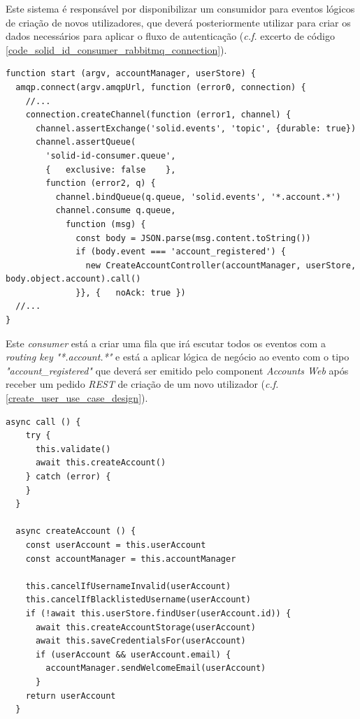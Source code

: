 Este sistema é responsável por disponibilizar um consumidor para eventos lógicos de criação de novos utilizadores, que deverá posteriormente utilizar para criar os dados necessários para aplicar o fluxo de autenticação (\emph{c.f.} excerto de código \ref{code_solid_id_consumer_rabbitmq_connection}).

\begin{lstlisting}[caption={\emph{Consumer} responsável pela ligação ao \emph{RabbitMQ}}, label={code_solid_id_consumer_rabbitmq_connection}]
function start (argv, accountManager, userStore) {
  amqp.connect(argv.amqpUrl, function (error0, connection) {
    //...
    connection.createChannel(function (error1, channel) {
      channel.assertExchange('solid.events', 'topic', {durable: true})
      channel.assertQueue(
        'solid-id-consumer.queue',
        {   exclusive: false    },
        function (error2, q) {
          channel.bindQueue(q.queue, 'solid.events', '*.account.*')
          channel.consume q.queue,
            function (msg) {
              const body = JSON.parse(msg.content.toString())
              if (body.event === 'account_registered') {
                new CreateAccountController(accountManager, userStore, body.object.account).call()
              }}, {   noAck: true })
  //...
}

\end{lstlisting}

Este \emph{consumer} está a criar uma fila que irá escutar todos os eventos com a \emph{routing key} \emph{"*.account.*"} e está a aplicar lógica de negócio ao evento com o tipo \emph{"account\_registered"} que deverá ser emitido pelo component \emph{Accounts Web} após receber um pedido \emph{\acrshort{REST}} de criação de um novo utilizador  (\emph{c.f.}  \ref{create_user_use_case_design}).

\begin{lstlisting}[caption={código CreateAccountController}]
async call () {
    try {
      this.validate()
      await this.createAccount()
    } catch (error) {
    }
  }

  async createAccount () {
    const userAccount = this.userAccount
    const accountManager = this.accountManager

    this.cancelIfUsernameInvalid(userAccount)
    this.cancelIfBlacklistedUsername(userAccount)
    if (!await this.userStore.findUser(userAccount.id)) {
      await this.createAccountStorage(userAccount)
      await this.saveCredentialsFor(userAccount)
      if (userAccount && userAccount.email) {
        accountManager.sendWelcomeEmail(userAccount)
      }
    return userAccount
  }

\end{lstlisting}

